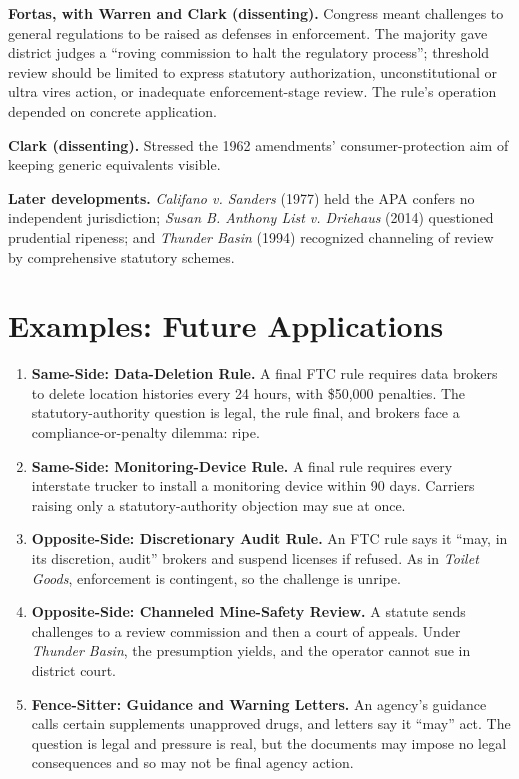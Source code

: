 \documentclass[12pt]{article}
\begin{document}
\textbf{Fortas, with Warren and Clark (dissenting).} Congress meant challenges to general regulations to be raised as defenses in enforcement. The majority gave district judges a ``roving commission to halt the regulatory process''; threshold review should be limited to express statutory authorization, unconstitutional or ultra vires action, or inadequate enforcement-stage review. The rule's operation depended on concrete application.

\textbf{Clark (dissenting).} Stressed the 1962 amendments' consumer-protection aim of keeping generic equivalents visible.

\textbf{Later developments.} \textit{Califano v. Sanders} (1977) held the APA confers no independent jurisdiction; \textit{Susan B. Anthony List v. Driehaus} (2014) questioned prudential ripeness; and \textit{Thunder Basin} (1994) recognized channeling of review by comprehensive statutory schemes.

\section{Examples: Future Applications}

\begin{enumerate}
\item \textbf{Same-Side: Data-Deletion Rule.} A final FTC rule requires data brokers to delete location histories every 24 hours, with \$50,000 penalties. The statutory-authority question is legal, the rule final, and brokers face a compliance-or-penalty dilemma: ripe.
\item \textbf{Same-Side: Monitoring-Device Rule.} A final rule requires every interstate trucker to install a monitoring device within 90 days. Carriers raising only a statutory-authority objection may sue at once.
\item \textbf{Opposite-Side: Discretionary Audit Rule.} An FTC rule says it ``may, in its discretion, audit'' brokers and suspend licenses if refused. As in \textit{Toilet Goods}, enforcement is contingent, so the challenge is unripe.
\item \textbf{Opposite-Side: Channeled Mine-Safety Review.} A statute sends challenges to a review commission and then a court of appeals. Under \textit{Thunder Basin}, the presumption yields, and the operator cannot sue in district court.
\item \textbf{Fence-Sitter: Guidance and Warning Letters.} An agency's guidance calls certain supplements unapproved drugs, and letters say it ``may'' act. The question is legal and pressure is real, but the documents may impose no legal consequences and so may not be final agency action.
\end{enumerate}
\end{document}
